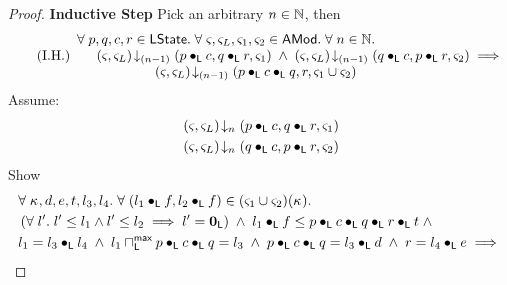 \begin{lemma}[]
\begin{proof}
\noindent
\textbf{}
\textbf{Inductive Step} Pick an arbitrary $n \in \mathbb{N}$, then
%
\begin{equation}
	\tag{I.H.}
	\begin{array}{l}
		\forall\; p, q, c, r \in \textsf{LState}.\; \forall\; \varsigma_{}, \varsigma_{L}, \varsigma_{1}, \varsigma_{2} \in \textsf{AMod}.\; \forall\; n \in \mathbb{N}.\;\\
		\hspace*{0.5cm} \left(\varsigma_{}, \varsigma_{L}\right) \!\downarrow_{(n-1)} \left(p \bullet_{\textsf{L}} c, q \bullet_{\textsf{L}} r, \varsigma_{1}\right) \;\land\; \left(\varsigma_{}, \varsigma_{L}\right) \!\downarrow_{(n-1)} \left(q \bullet_{\textsf{L}} c, p \bullet_{\textsf{L}} r, \varsigma_{2}\right)
		\implies\\
		\hspace*{2cm} \left(\varsigma_{}, \varsigma_{L}\right) \!\downarrow_{(n-1)} \left(p \bullet_{\textsf{L}} c \bullet_{\textsf{L}} q, r, \varsigma_{1} \cup \varsigma_{2}\right)
	\end{array}
\label{LM:I.H}
\end{equation}
%
Assume:
%
\begin{align}
	& \left(\varsigma_{}, \varsigma_{L}\right) \!\downarrow_{n} \left(p \bullet_{\textsf{L}} c, q \bullet_{\textsf{L}} r, \varsigma_{1}\right) \label{LM:Ass6}\\
	& \left(\varsigma_{}, \varsigma_{L}\right) \!\downarrow_{n} \left(q \bullet_{\textsf{L}} c, p \bullet_{\textsf{L}} r, \varsigma_{2}\right) \label{LM:Ass7}
\end{align}
%
Show
%
\begin{align}
	&\for{\ca{}, d, e, t, l_3, l_4}\for{(l_1 \composeL f, l_2 \composeL f) \in (\amod{1} \cup \amod{2})(\ca{})} \nonumber\\
	& \left(\for{l'} l' \leq l_1 \land l' \leq l_2 \implies l' = \unitL\right) \;\land\; l_1 \composeL f \leq  p  \composeL c \composeL q \composeL r \composeL t \;\land \nonumber\\
	& l_1 = l_3 \composeL l_4 \;\land\; l_1 \maxMeetL p \composeL c \composeL q = l_3 \;\land\; p \composeL c \composeL q = l_3 \composeL d \;\land\; r = l_4 \composeL e \implies \nonumber\\

\end{align}
\end{proof}
\end{lemma}
